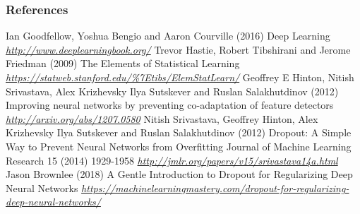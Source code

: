   \begin{vbframe}
\frametitle{References}
\footnotesize{
  \begin{thebibliography}{99}
     Ian Goodfellow, Yoshua Bengio and Aaron Courville (2016)
  \newblock Deep Learning
  \newblock \emph{\url{http://www.deeplearningbook.org/}}
     Trevor Hastie, Robert Tibshirani and Jerome Friedman (2009)
  \newblock The Elements of Statistical Learning
  \newblock \emph{\url{https://statweb.stanford.edu/\%7Etibs/ElemStatLearn/}}
     Geoffrey E Hinton, Nitish Srivastava, Alex Krizhevsky Ilya Sutskever and Ruslan Salakhutdinov (2012)
  \newblock Improving neural networks by preventing co-adaptation of feature detectors
  \newblock \emph{\url{http://arxiv.org/abs/1207.0580}}
     Nitish Srivastava, Geoffrey Hinton, Alex Krizhevsky Ilya Sutskever and Ruslan Salakhutdinov (2012)
  \newblock Dropout:  A Simple Way to Prevent Neural Networks from Overfitting
  \newblock Journal of Machine Learning Research 15 (2014) 1929-1958
  \newblock \emph{\url{http://jmlr.org/papers/v15/srivastava14a.html}}
     Jason Brownlee (2018) 
  \newblock A Gentle Introduction to Dropout for Regularizing Deep Neural Networks
  \newblock \emph{\url{https://machinelearningmastery.com/dropout-for-regularizing-deep-neural-networks/}}

  \end{thebibliography}
}
\end{vbframe}

\endlecture
